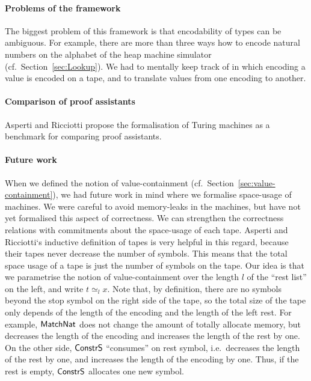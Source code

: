\paragraph{Problems of the framework}
The biggest problem of this framework is that encodability of types can be ambiguous.  For example, there are more than three ways how to encode
natural numbers on the alphabet of the heap machine simulator (cf.~Section~\ref{sec:Lookup}).  We had to mentally keep track of in which encoding a
value is encoded on a tape, and to translate values from one encoding to another.


\paragraph{Comparison of proof assistants}
Asperti and Ricciotti\cite{asperti2015} propose the formalisation of Turing machines as a benchmark for comparing proof assistants.



\paragraph{Future work}
When we defined the notion of value-containment (cf.~Section~\ref{sec:value-containment}), we had future work in mind where we formalise space-usage
of machines.  We were careful to avoid memory-leaks in the machines, but have not yet formalised this aspect of correctness.  We can strengthen the
correctness relations with commitments about the space-usage of each tape.  Asperti and Ricciotti`s inductive definition of tapes is very helpful in
this regard, because their tapes never decrease the number of symbols.  This means that the total space usage of a tape is just the number of symbols
on the tape.  Our idea is that we parametrise the notion of value-containment over the length $l$ of the ``rest list'' on the left, and write
$t \simeq_{l} x$.  Note that, by definition, there are no symbols beyond the stop symbol on the right side of the tape, so the total size of the tape
only depends of the length of the encoding and the length of the left rest.  For example, $\mathsf{MatchNat}$ does not change the amount of totally
allocate memory, but decreases the length of the encoding and increases the length of the rest by one.  On the other side, $\mathsf{ConstrS}$ ``consumes''
on rest symbol, i.e.\ decreases the length of the rest by one, and increases the length of the encoding by one.  Thus, if the rest is empty,
$\mathsf{ConstrS}$ allocates one new symbol.

